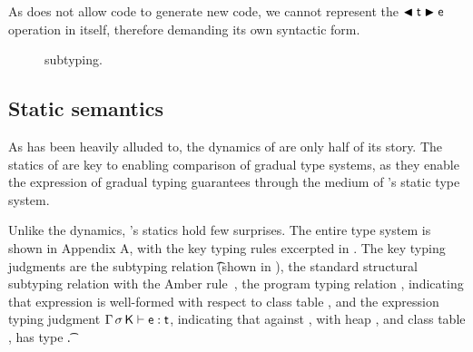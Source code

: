 \documentclass[a4paper,USenglish]{tex/lipics-v2016}
\begin{document}
As \kafka does not allow code to generate new code, we cannot represent the
$\BehCast\t\e$ operation in \kafka itself, therefore demanding its own
syntactic form.

\begin{figure}[!b] \hrulefill\small

\vspace{-2mm}

\begin{mathpar}

\hspace{-8mm}


\hspace{-8mm}

\end{mathpar}

\hrulefill\caption{\kafka subtyping.}\label{sub}%
\end{figure}


\subsection{Static semantics}

As has been heavily alluded to, the dynamics of \kafka are only half of its
story. The statics of \kafka are key to enabling comparison of gradual type
systems, as they enable the expression of gradual typing guarantees through
the medium of \kafka's static type system.

Unlike the dynamics, \kafka's statics hold few surprises. The entire type
system is shown in Appendix A, with the key typing rules excerpted in
. The key typing judgments are the subtyping relation
\StrSub\M\K\t\tp (shown in ), the standard structural subtyping
relation with the Amber rule~\cite{cardelli1985amber}, the program typing
relation \WFp\e\K, indicating that expression \e is well-formed with respect
to class table \K, and the expression typing judgment $\EnvType \Env\s\K\e\t$,
indicating that against \Env, with heap \s, and class table \K, \e has type
\t.
\end{document}
